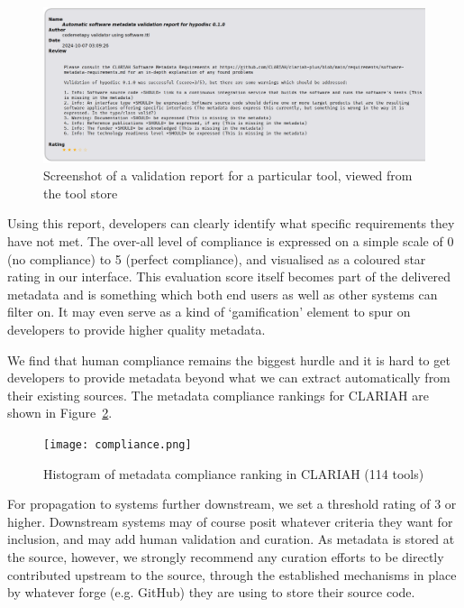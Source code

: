 \documentclass[a4paper,11pt]{article}
\begin{document}
\begin{figure}[h]
\begin{center}
\includegraphics[width=14.0cm]{screenshot_report.png}
\caption{Screenshot of a validation report for a particular tool, viewed from the tool store}
\end{center}
\label{fig:validationreport}
\end{figure}

Using this report, developers can clearly identify what specific requirements
they have not met. The over-all level of compliance is expressed on a simple
scale of 0 (no compliance) to 5 (perfect compliance), and visualised as a
coloured star rating in our interface. This evaluation score itself becomes part of
the delivered metadata and is something which both end users as well as other
systems can filter on. It may even serve as a kind of `gamification' element to
spur on developers to provide higher quality metadata.

We find that human compliance remains the biggest hurdle and it is hard to get
developers to provide metadata beyond what we can extract automatically from
their existing sources. The metadata compliance rankings for CLARIAH are shown
in Figure~\ref{fig:compliance}.

\begin{figure}[h!]
\begin{center}
\texttt{[image: compliance.png]}
\caption{Histogram of metadata compliance ranking in CLARIAH (114 tools)}
\end{center}
\label{fig:compliance}
\end{figure}

For propagation to systems further downstream, we set a threshold rating of 3
or higher. Downstream systems may of course posit whatever criteria they want
for inclusion, and may add human validation and curation. As metadata is stored
at the source, however, we strongly recommend any curation efforts to be
directly contributed upstream to the source, through the established mechanisms
in place by whatever forge (e.g. GitHub) they are using to store their source
code.
\end{document}
